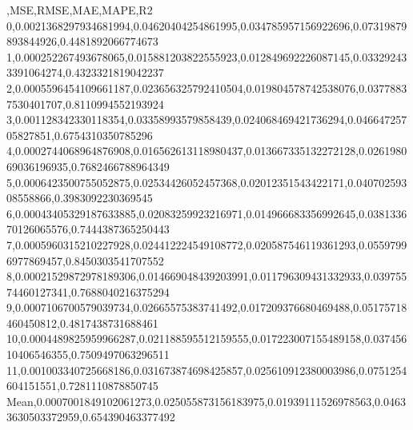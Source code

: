 ,MSE,RMSE,MAE,MAPE,R2
0,0.0021368297934681994,0.04620404254861995,0.034785957156922696,0.07319879893844926,0.4481892066774673
1,0.000252267493678065,0.015881203822555923,0.012849692226087145,0.033292433391064274,0.4323321819042237
2,0.0005596454109661187,0.023656325792410504,0.019804578742538076,0.03778837530401707,0.8110994552193924
3,0.001128342330118354,0.03358993579858439,0.024068469421736294,0.04664725705827851,0.6754310350785296
4,0.0002744068964876908,0.016562613118980437,0.013667335132272128,0.026198069036196935,0.7682466788964349
5,0.0006423500755052875,0.02534426052457368,0.02012351543422171,0.04070259308558866,0.3983092230369545
6,0.00043405329187633885,0.02083259923216971,0.014966683356992645,0.038133670126065576,0.7444387365250443
7,0.0005960315210227928,0.024412224549108772,0.020587546119361293,0.05597996977869457,0.8450303541707552
8,0.00021529872978189306,0.014669048439203991,0.011796309431332933,0.03975574460127341,0.7688040216375294
9,0.0007106700579039734,0.02665575383741492,0.017209376680469488,0.05175718460450812,0.4817438731688461
10,0.0004489825959966287,0.021188595512159555,0.017223007155489158,0.03745610406546355,0.7509497063296511
11,0.001003340725668186,0.031673874698425857,0.025610912380003986,0.0751254604151551,0.7281110878850745
Mean,0.0007001849102061273,0.025055873156183975,0.01939111526978563,0.04633630503372959,0.654390463377492
